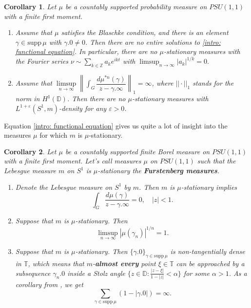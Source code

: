 \documentclass[11pt]{article}
\newtheorem{corollary}{Corollary}[section]
\begin{document}
\begin{corollary}
	\label{C:main corollary}
	Let $\mu$ be a countably supported probability measure on $PSU(1,1)$ with a finite first moment.
	\begin{enumerate}
		\item Assume that $\mu$ satisfies the Blaschke condition, and there is an element $\gamma \in \text{supp} \, \mu$ with $\gamma.0 \ne 0$. Then there are no entire solutions to \eqref{intro: functional equation}. In particular, there are no $\mu$-stationary measures with the Fourier series $\nu \sim \sum_{k \in \mathbb{Z}} a_k e^{i k t}$ with $\limsup_{n \rightarrow \infty} |a_k|^{1/k} = 0.$
		\item Assume that $\limsup\limits_{n \rightarrow \infty} \left\| \int_G \dfrac{d \mu^{*n}(\gamma)}{z - \gamma.\infty} \right\|_1 = \infty$, where $||\cdot||_1$ stands for the norm in $H^1(\mathbb{D})$. Then there are no $\mu$-stationary measures with $L^{1+\varepsilon}(S^1, m)$-density for any $\varepsilon > 0$.
	\end{enumerate}
\end{corollary}

Equation \eqref{intro: functional equation} gives us quite a lot of insight into the measures $\mu$ for which $m$ is $\mu$-stationary.

\begin{corollary}
	\label{intro: Lebesgue is stationary}
	Let $\mu$ be a countably supported finite Borel measure on $PSU(1,1)$ with a finite first moment. Let's call measures $\mu$ on $PSU(1,1)$ such that the Lebesgue measure $m$ on $S^1$ is $\mu$-stationary the \textbf{Furstenberg measures}.
	\begin{enumerate}
		\item Denote the Lebesgue measure on $S^1$ by $m$. Then $m$ is $\mu$-stationary implies
		\begin{equation}
			\int_G \frac{d \mu(\gamma)}{z - \gamma.\infty} = 0, \quad |z| < 1.
		\end{equation}
		\item Suppose that $m$ is $\mu$-stationary. Then
		\[
		\limsup_{n \rightarrow \infty} |\mu(\gamma_n)|^{1/n} = 1.
		\]
		\item Suppose that $m$ is $\mu$-stationary. Then $\{\gamma.0\}_{\gamma \in \text{supp} \, \mu}$ is non-tangentially dense in $\mathbb{T}$, which means that $m$-\textbf{almost every} point $\xi \in \mathbb{T}$ can be approached by a subsequence $\gamma_n.0$ inside a Stolz angle $\{ z \in \mathbb{D} : \frac{|z - \xi|}{1 - |z|} < \alpha \}$ for some $\alpha > 1$. As a corollary from \cite[Remark 2]{brownsums}, we get
		\[
		\sum_{\gamma \in \text{supp}\, \mu} (1 - |\gamma.0|) = \infty.
		\]
	\end{enumerate}
\end{corollary}
\end{document}
